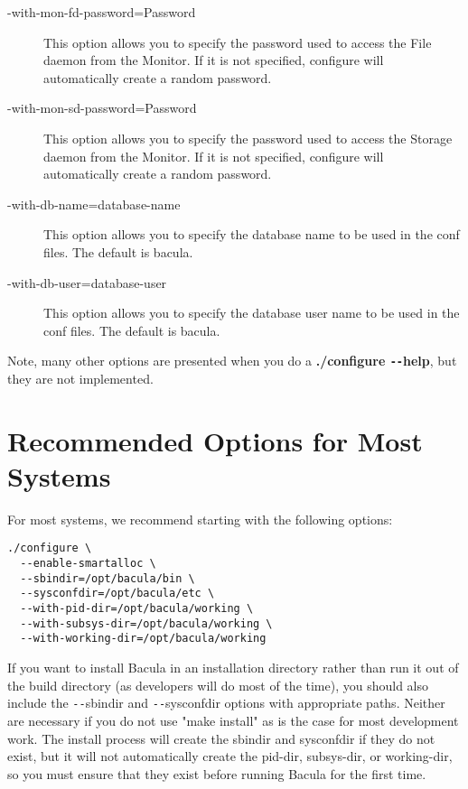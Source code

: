 \begin{description}
\item [ {-}{\-}with-mon-fd-password=\lt{}Password\gt{} ]
   This option allows you to specify the password used to  access the File daemon
   from the Monitor.  If it is not specified, configure will
   automatically create a random  password.  

\item [ {-}{\-}with-mon-sd-password=\lt{}Password\gt{} ]
   This option allows you to specify the password used to  access the
   Storage daemon from the Monitor. If it is not specified, configure will
   automatically create a random  password.  

\item [ {-}{\-}with-db-name=\lt{}database-name\gt{} ]
   This option allows you to specify the database name to be used in
   the conf files.  The default is bacula.

\item [ {-}{\-}with-db-user=\lt{}database-user\gt{} ]
   This option allows you to specify the database user name to be used in
   the conf files.  The default is bacula.

\end{description}

Note, many other options are presented when you do a {\bf ./configure
\verb:--:help}, but they are not implemented.

\section{Recommended Options for Most Systems}

For most systems, we recommend starting with the following options: 

\footnotesize
\begin{verbatim}
./configure \
  --enable-smartalloc \
  --sbindir=/opt/bacula/bin \
  --sysconfdir=/opt/bacula/etc \
  --with-pid-dir=/opt/bacula/working \
  --with-subsys-dir=/opt/bacula/working \
  --with-working-dir=/opt/bacula/working
\end{verbatim}
\normalsize

If you want to install Bacula in an installation directory rather than run it
out of the build directory (as developers will do most of the time), you
should also include the \verb:--:sbindir and \verb:--:sysconfdir options with appropriate
paths. Neither are necessary if you do not use "make install" as is the case
for most development work. The install process will create the sbindir and
sysconfdir if they do not exist, but it will not automatically create the
pid-dir, subsys-dir, or working-dir, so you must ensure that they exist before
running Bacula for the first time.

